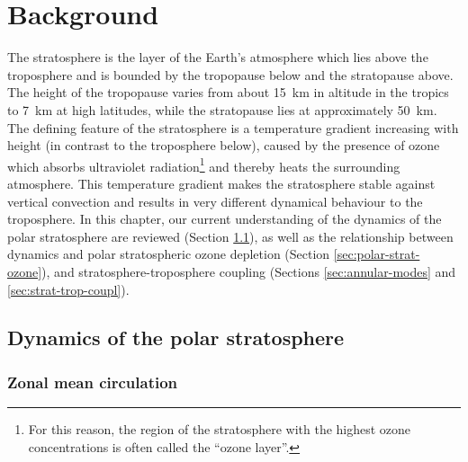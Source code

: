 \chapter{Background}
\label{cha:background}


The stratosphere is the layer of the Earth's atmosphere which lies above the
troposphere and is bounded by the tropopause below and the stratopause
above. The height of the tropopause varies from about 15~km in altitude in the
tropics to 7~km at high latitudes, while the stratopause lies at approximately
50~km. The defining feature of the stratosphere is a temperature gradient
increasing with height (in contrast to the troposphere below), caused by the
presence of ozone which absorbs ultraviolet radiation\footnote{For this reason,
  the region of the stratosphere with the highest ozone concentrations is often
  called the ``ozone layer''.}  and thereby heats the surrounding
atmosphere. This temperature gradient makes the stratosphere stable against
vertical convection and results in very different dynamical behaviour to the
troposphere. In this chapter, our current understanding of the dynamics of the
polar stratosphere are reviewed (Section \ref{sec:dynam-polar-strat}), as well
as the relationship between dynamics and polar stratospheric ozone depletion
(Section \ref{sec:polar-strat-ozone}), and stratosphere-troposphere coupling
(Sections \ref{sec:annular-modes} and \ref{sec:strat-trop-coupl}).

\section{Dynamics of the polar stratosphere}
\label{sec:dynam-polar-strat}


\subsection{Zonal mean circulation}

